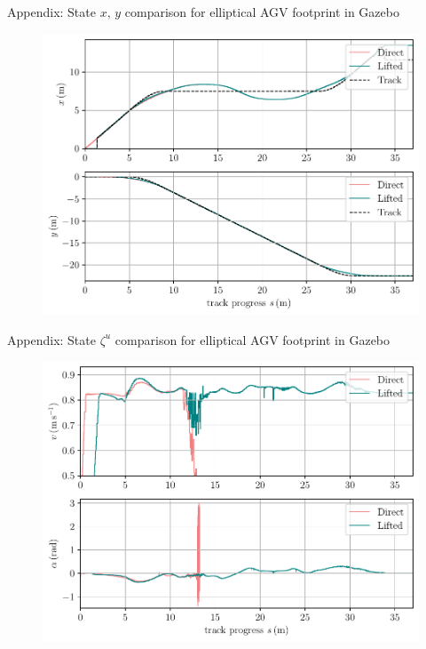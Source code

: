 \documentclass[10pt,aspectratio=1610]{beamer} %
\begin{document}
\begin{frame}{Appendix: State $x,\,y$  comparison for elliptical AGV footprint in Gazebo}
	\begin{figure}[h!tbp]
		\includegraphics[scale=0.65]{figures/zeta_c_el}
	\end{figure}
\end{frame}

\begin{frame}{Appendix: State $\zeta^{u}$ comparison for elliptical AGV footprint in Gazebo}
	\begin{figure}[h!tbp]
		\includegraphics[scale=0.65]{figures/zeta_u_2c}
	\end{figure}
\end{frame}
\end{document}
